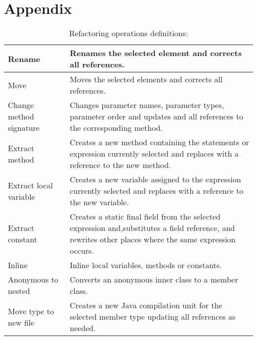 
\section{Appendix} %
\label{sec:attachments}

\begin{table}[h]
\caption{Refactoring operations definitions:}
\label{tab-Refactoring-Definitions}
\begin{tabular}{p{3 cm} | p{10.5 cm}}
Rename                    & Renames the selected element and corrects all references.                                                                                                                 \\ \hline
Move                      & Moves the selected elements and corrects all references.                                                                                                                  \\ \hline
Change method signature   & Changes parameter names, parameter types, parameter order and updates and all references to the corresponding method.                                                     \\ \hline
Extract method            & Creates a new method containing the statements or expression currently selected and replaces with a reference to the new method.                                          \\ \hline
Extract local variable    & Creates a new variable assigned to the expression currently selected and replaces with a reference to the new variable.                                                   \\ \hline
Extract constant          & Creates a static final field from the selected expression and,substitutes a field reference, and rewrites other places where the same expression occurs.                  \\ \hline
Inline                    & Inline local variables, methods or constants.                                                                                                                             \\ \hline
Anonymous to nested       & Converts an anonymous inner class to a member class.                                                                                                                      \\ \hline
Move type to new file     & Creates a new Java compilation unit for the selected member type updating all references as needed.                                                                       \\ \hline

\end{tabular}
\end{table}
